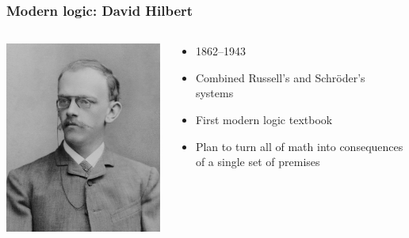 \begin{frame}
  \frametitle{Modern logic: David Hilbert}

  \begin{columns}
    \begin{column}{.5\textwidth}
      \includegraphics[height=.8\textheight]{../assets/hilbert}
    \end{column}
    \begin{column}{.5\textwidth}
      \begin{itemize}[<+->]
        \item 1862--1943
        \item Combined Russell's and Schr\"oder's systems
        \item First modern logic textbook
        \item Plan to turn all of math into consequences of a single set of premises
      \end{itemize}
    \end{column}
  \end{columns}
\end{frame}

